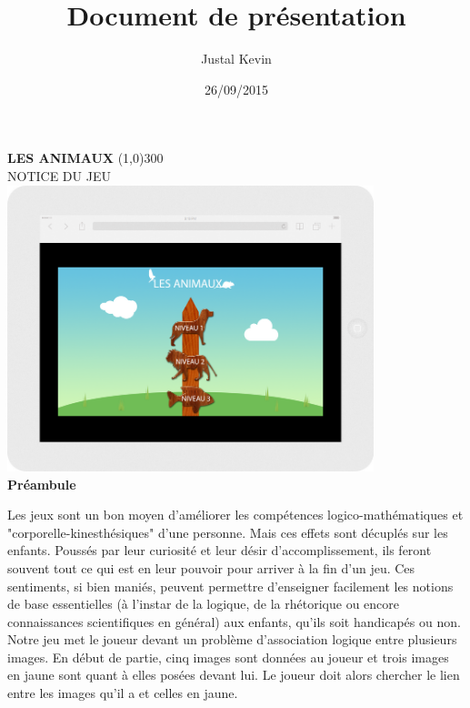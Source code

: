 \documentclass{article}
\title{Document de présentation}
\author{Justal Kevin}
\date{26/09/2015}
\begin{document}
\begin{center}
\textbf{\Huge{LES ANIMAUX}}
\line(1,0){300}\\
NOTICE DU JEU\\
\vspace{3cm}
\includegraphics[width=0.8\textwidth]{tablette}\\
\vspace{3cm}
\textbf{Pr\'eambule}
\end{center}

\hspace*{0.6cm}Les jeux sont un bon moyen d'am\'eliorer les compétences logico-mathématiques et "corporelle-kinesthésiques" d'une personne. Mais ces effets sont décuplés sur les enfants. Poussés par leur curiosité et leur désir d'accomplissement, ils feront souvent tout ce qui est en leur pouvoir pour arriver à la fin d'un jeu. Ces sentiments, si bien maniés, peuvent permettre d'enseigner facilement les notions de base essentielles (à l'instar de la logique, de la rhétorique ou encore connaissances scientifiques en général) aux enfants, qu'ils soit handicapés ou non.
\vspace{0.5cm}\\
\hspace*{0.6cm}Notre jeu met le joueur devant un problème d'association logique entre plusieurs images. En début de partie, cinq images sont données au joueur et trois images en jaune sont quant à elles posées devant lui. Le joueur doit alors chercher le lien entre les images qu'il a et celles en jaune.

\newpage
\tableofcontents

\newpage
\end{document}
